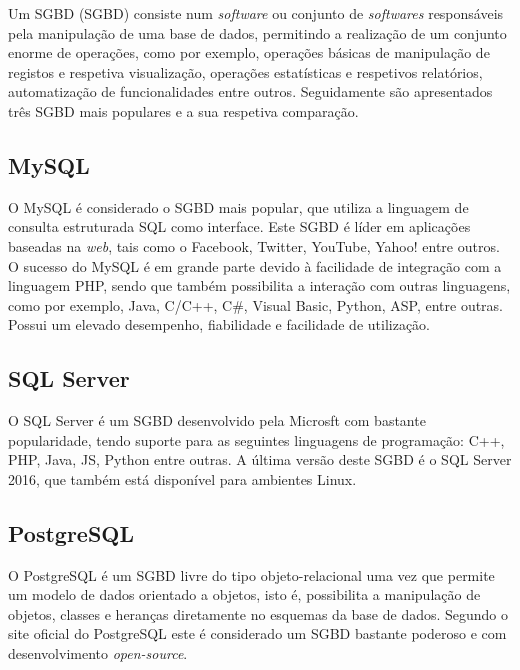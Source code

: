 Um \acl{SGBD} (\acs{SGBD}) consiste num \textit{software} ou conjunto de \textit{softwares} responsáveis pela manipulação de uma base de dados, permitindo a realização de um conjunto enorme de operações, como por exemplo, operações básicas de manipulação de registos e respetiva visualização, operações estatísticas e respetivos relatórios, automatização de funcionalidades entre outros. Seguidamente são apresentados três \ac{SGBD} mais populares e a sua respetiva comparação. 


\subsection{MySQL}


O MySQL é considerado o \ac{SGBD} mais popular, que utiliza a linguagem de consulta estruturada \ac{SQL} como interface. Este \ac{SGBD} é líder em aplicações baseadas na \textit{web}, tais como o Facebook, Twitter, YouTube, Yahoo! entre outros. O sucesso do MySQL é em grande parte devido à facilidade de  integração com a linguagem PHP, sendo que também possibilita a interação com outras linguagens, como por exemplo, Java, C/C++, C\#, Visual Basic, Python, ASP, entre outras. Possui um elevado desempenho, fiabilidade e facilidade de utilização\cite{MySQL2011}\cite{why-msql}.	








\subsection{SQL Server}

O SQL Server é um \ac{SGBD} desenvolvido pela Microsft com bastante popularidade, tendo suporte para as seguintes linguagens de programação: C++, PHP, Java, \ac{JS}, Python entre outras. A última versão deste \ac{SGBD} é o SQL Server 2016, que também está disponível para ambientes Linux\cite{linuxsqlserver}.




\subsection{PostgreSQL}

O PostgreSQL é um \ac{SGBD} livre do tipo objeto-relacional uma vez que permite um modelo de dados orientado a objetos, isto é, possibilita a manipulação de objetos, classes e heranças diretamente no esquemas da base de dados. Segundo o site oficial do PostgreSQL este é considerado um \ac{SGBD} bastante poderoso e com desenvolvimento \textit{open-source}\cite{ThePostgreSQLGlobalDevelopmentGroup2012}. 


